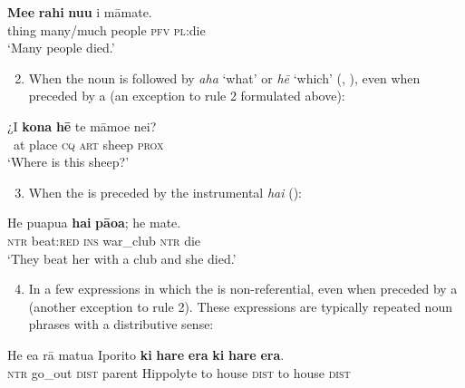\ea\label{ex:5.17}
\gll \textbf{Me{\ꞌ}e} \textbf{rahi} \textbf{nu{\ꞌ}u} i māmate. \\
thing many/much people \textsc{pfv} \textsc{pl}:die \\

\glt
‘Many people died.’ \textstyleExampleref{[R532-05.002]}
\z

\begin{enumerate}
\setcounter{enumi}{1}
\item
When the noun is followed by \textit{aha} ‘what’ or \textit{hē} ‘which’ (, ), even when preceded by a  (an exception to rule 2 formulated above):
\end{enumerate}

\ea\label{ex:5.18}
\gll ¿{\ꞌ}I \textbf{kona} \textbf{hē} te māmoe nei? \\
~at place \textsc{cq} \textsc{art} sheep \textsc{prox} \\

\glt
‘Where is this sheep?’ \textstyleExampleref{[R536.037]} 
\z

\begin{enumerate}
\setcounter{enumi}{2}
\item
When the  is preceded by the instrumental  \textit{hai} ():
\end{enumerate}

\ea\label{ex:5.19}
\gll He pu{\ꞌ}apu{\ꞌ}a \textbf{hai} \textbf{pāoa}; he mate. \\
\textsc{ntr} beat:\textsc{red} \textsc{ins} war\_club \textsc{ntr} die \\

\glt
‘They beat her with a club and she died.’ \textstyleExampleref{[Egt-01.082]}
\z

\begin{enumerate}
\setcounter{enumi}{3}
\item
In a few expressions in which the  is non-referential, even when preceded by a  (another exception to rule 2). These expressions are typically repeated noun phrases with a distributive sense:
\end{enumerate}

\ea\label{ex:5.20}
\gll He e{\ꞌ}a rā matu{\ꞌ}a Iporito \textbf{ki} \textbf{hare} \textbf{era} \textbf{ki} \textbf{hare} \textbf{era}. \\
\textsc{ntr} go\_out \textsc{dist} parent Hippolyte to house \textsc{dist} to house \textsc{dist} \\

